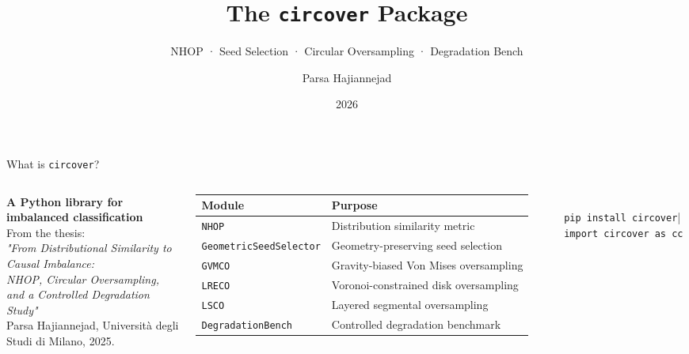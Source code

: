 \documentclass[aspectratio=169,10pt]{beamer}
\title[circover]{The \texttt{circover} Package}
\subtitle{NHOP · Seed Selection · Circular Oversampling · Degradation Bench}
\author{Parsa Hajiannejad}
\institute{Università degli Studi di Milano}
\date{2026}
\begin{document}
\begin{frame}\titlepage\end{frame}

\begin{frame}[t]{What is \texttt{circover}?}
\begin{columns}[T]
{\small\bfseries\color{myblue}A Python library for imbalanced classification}\\[3pt]
{\footnotesize From the thesis:\\[1pt]
\textit{"From Distributional Similarity to Causal Imbalance:\\
NHOP, Circular Oversampling, and a Controlled Degradation Study"}\\[1pt]
Parsa Hajiannejad, Università degli Studi di Milano, 2025.}\\[5pt]

{\scriptsize\begin{tabular}{@{}lp{4.0cm}@{}}
\toprule
Module & Purpose \\
\midrule
\texttt{NHOP} & Distribution similarity metric \\
\texttt{GeometricSeedSelector} & Geometry-preserving seed selection \\
\texttt{GVMCO} & Gravity-biased Von Mises oversampling \\
\texttt{LRECO} & Voronoi-constrained disk oversampling \\
\texttt{LSCO} & Layered segmental oversampling \\
\texttt{DegradationBench} & Controlled degradation benchmark \\
\bottomrule
\end{tabular}}\\[4pt]
{\footnotesize\texttt{pip install circover}\quad|\quad
\texttt{import circover as cc}}


\end{columns}
\end{frame}
\end{document}
